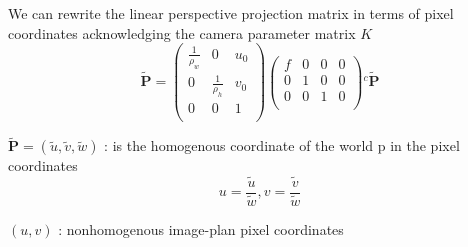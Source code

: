 \documentclass[journal,final,a4paper,twoside]{PS}
\begin{document}
We can rewrite the linear perspective projection matrix in terms of pixel coordinates acknowledging the camera parameter matrix  $K$
\begin{equation}
\tilde{\textbf{P}}= \begin{pmatrix}
\frac{1}{\rho_w}&0&u_0\\
0&\frac{1}{\rho_h}&v_0\\
0&0&1\\
\end{pmatrix}\begin{pmatrix}
f&0&0&0\\
0&1&0&0\\
0&0&1&0\\
\end{pmatrix}{}^{c}\tilde{\textbf{P}}
\end{equation}

$\tilde{\textbf{P}}=(\tilde{u},\tilde{v},\tilde{w})$ : is the homogenous coordinate of the world p in the pixel coordinates
\begin{equation}
u= \frac{\tilde{u}}{\tilde{w}}, v= \frac{\tilde{v}}{\tilde{w}}
\end{equation}

$(u,v)$ : nonhomogenous image-plan pixel coordinates
\end{document}
